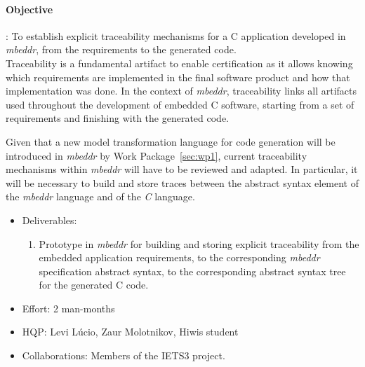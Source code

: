 \paragraph{\textbf{Objective}}: To establish explicit traceability mechanisms
for a C application developed in \emph{mbeddr}, from the requirements to
the generated code.\vspace{.2cm}\\
Traceability is a fundamental artifact to enable certification as it allows
knowing which requirements are implemented in the final software product and how
that implementation was done. In the context of \emph{mbeddr}, traceability links all
artifacts used throughout the development of embedded C software, starting from
a set of requirements and finishing with the generated code. 

Given that a new model transformation language for code generation will be
introduced in \emph{mbeddr} by Work Package~\ref{sec:wp1}, current
traceability mechanisms within \emph{mbeddr} will have to be reviewed and
adapted. In particular, it will be necessary to build and store traces between
the abstract syntax element of the \emph{mbeddr} language and of the \emph{C}
language.

\begin{itemize}
  \item Deliverables:
  \begin{enumerate}
    \item Prototype in \emph{mbeddr} for building and storing explicit traceability
    from the embedded application requirements, to the corresponding \emph{mbeddr}
    specification abstract syntax, to the corresponding abstract syntax tree for
    the generated C code.
  \end{enumerate}
  \item Effort: 2 man-months
  \item HQP: Levi L\'ucio, Zaur Molotnikov, Hiwis student
  \item Collaborations: Members of the IETS3 project.
\end{itemize}
